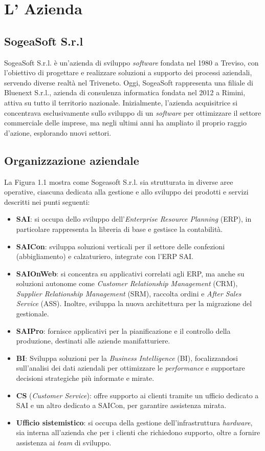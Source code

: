 \chapter{L' Azienda}
    \section{SogeaSoft S.r.l}
    SogeaSoft S.r.l. è un'azienda di sviluppo \textit{software} fondata nel 1980 a Treviso, con l'obiettivo di progettare e realizzare soluzioni a supporto dei processi aziendali, servendo diverse realtà nel Triveneto.
    Oggi, SogeaSoft rappresenta una filiale di Bluenext S.r.l., azienda di consulenza informatica fondata nel 2012 a Rimini, attiva su tutto il territorio nazionale. Inizialmente, l'azienda acquisitrice si concentrava esclusivamente sullo sviluppo di un \textit{software} per ottimizzare il settore commerciale delle imprese, ma negli ultimi anni ha ampliato il proprio raggio d'azione, esplorando nuovi settori.
    
    \section{Organizzazione aziendale}
    La Figura 1.1 mostra come Sogeasoft S.r.l. sia strutturata in diverse aree operative, ciascuna dedicata alla gestione e allo sviluppo dei prodotti e servizi descritti nei punti seguenti: 
    
    \begin{itemize}
        \item \textbf{SAI}: si occupa dello sviluppo dell'\textit{Enterprise Resource Planning} (ERP), in particolare rappresenta la libreria di base e gestisce la contabilità.
        \item \textbf{SAICon}: sviluppa soluzioni verticali per il settore delle confezioni (abbigliamento) e calzaturiero, integrate con l'ERP SAI.
        \item \textbf{SAIOnWeb}: si concentra su applicativi correlati agli ERP, ma anche su soluzioni autonome come \textit{Customer Relationship Management} (CRM), \textit{Supplier Relationship Management} (SRM), raccolta ordini e \textit{After Sales Service} (ASS). Inoltre, sviluppa la nuova architettura per la migrazione del gestionale.
        \item \textbf{SAIPro}: fornisce applicativi per la pianificazione e il controllo della produzione, destinati alle aziende manifatturiere.
        \item \textbf{BI}: Sviluppa soluzioni per la \textit{Business Intelligence} (BI), focalizzandosi sull'analisi dei dati aziendali per ottimizzare le \textit{performance} e supportare decisioni strategiche più informate e mirate. 
        \item \textbf{CS} (\textit{Customer Service}): offre supporto ai clienti tramite un ufficio dedicato a SAI e un altro dedicato a SAICon, per garantire assistenza mirata.
        \item \textbf{Ufficio sistemistico}: si occupa della gestione dell'infrastruttura \textit{hardware}, sia interna all'azienda che per i clienti che richiedono supporto, oltre a fornire assistenza ai \textit{team} di sviluppo.
    \end{itemize}
    
